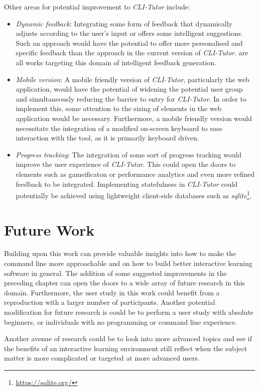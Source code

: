 Other areas for potential improvement to \textit{CLI-Tutor} include:

\begin{itemize}

	\item  \textit{Dynamic feedback}: Integrating some form of feedback that
	      dynamically adjusts according to the user's input or offers some
	      intelligent suggestions. Such an approach would have the potential to
	      offer more personalised and specific feedback than the approach in the
	      current version of \textit{CLI-Tutor}. \cite{keuning2014strategy,
		      gerdes2017ask, rivers2017data} are all works targeting this domain of
	      intelligent feedback generation.

	\item \textit{Mobile version}: A mobile friendly version of
	      \textit{CLI-Tutor}, particularly the web application, would have the
	      potential of widening the potential user group and simultaneously
	      reducing the barrier to entry for \textit{CLI-Tutor}. In order to
	      implement this, some attention to the sizing of elements in the web
	      application would be necessary. Furthermore, a mobile friendly
	      version would necessitate the integration of a modified on-screen
	      keyboard to ease interaction with the tool, as it is primarily
	      keyboard driven.

	\item \textit{Progress tracking}: The integration of some sort of
	      progress tracking would improve the user experience of
	      \textit{CLI-Tutor}. This could open the doors to elements such as
	      gameificaton or performance analytics and even more refined feedback
	      to be integrated. Implementing statefulness in \textit{CLI-Tutor}
	      could potentially be achieved using lightweight client-side databases
	      such as \textit{sqlite}\footnote{\url{https://sqlite.org/}}.

\end{itemize}


\section{Future Work}
Building upon this work can provide valuable insights into how to make the
command line more approachable and on how to build better interactive learning
software in general. The addition of some suggested improvements in the
preceding chapter can open the doors to a wide array of future research in
this domain. Furthermore, the user study in this work could benefit from a
reproduction with a larger number of participants. Another potential
modification for future research is could be to perform a user study with
absolute beginners, or individuals with no programming or command line
experience.  

Another avenue of research could be to look into more advanced topics and see if
the benefits of an interactive learning environment still reflect when the
subject matter is more complicated or targeted at more advanced users.

